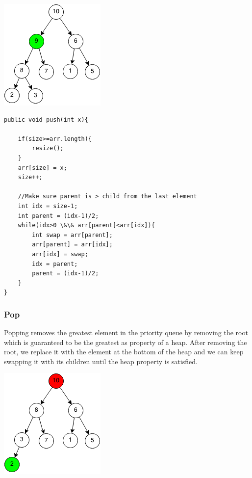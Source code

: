 \documentclass[11pt,oneside]{book}
\makeatletter
\def\maxwidth#1{\ifdim\Gin@nat@width>#1 #1\else\Gin@nat@width\fi}
\makeatother
\begin{document}
\vspace{5px}\includegraphics[width=\maxwidth{\textwidth}]{maxheappush3.png}

\begin{lstlisting}
public void push(int x){
        
    if(size>=arr.length){
        resize();
    }
    arr[size] = x;
    size++;
    
    //Make sure parent is > child from the last element
    int idx = size-1;
    int parent = (idx-1)/2;
    while(idx>0 \&\& arr[parent]<arr[idx]){
        int swap = arr[parent];
        arr[parent] = arr[idx];
        arr[idx] = swap;
        idx = parent;
        parent = (idx-1)/2;
    }
}
\end{lstlisting}

\subsubsection{Pop}

Popping removes the greatest element in the priority queue by removing the root which is guaranteed to be the greatest as property of a heap. After removing the root, we replace it with the element at the bottom of the heap and we can keep swapping it with its children until the heap property is satisfied.

\vspace{5px}\includegraphics[width=\maxwidth{\textwidth}]{maxheappop.png}
\end{document}
